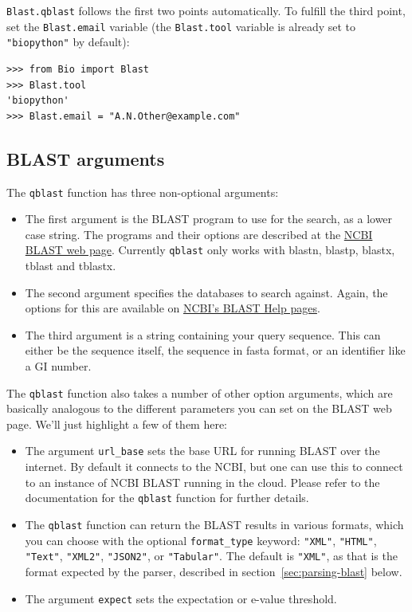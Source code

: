 \verb|Blast.qblast| follows the first two points automatically. 
To fulfill the third point, set the \verb|Blast.email| variable (the
\verb|Blast.tool| variable is already set to \verb|"biopython"| by default):
\begin{verbatim}
>>> from Bio import Blast
>>> Blast.tool
'biopython'
>>> Blast.email = "A.N.Other@example.com"
\end{verbatim}

\subsection{BLAST arguments}
\label{subsec:blast-arguments}

The \verb|qblast| function has three non-optional arguments:
\begin{itemize}
\item The first argument is the BLAST program to use for the search, as a
lower case string. The programs and their options are described at the
\href{https://blast.ncbi.nlm.nih.gov/Blast.cgi}{NCBI BLAST web page}.
Currently \verb|qblast| only works with blastn, blastp, blastx, tblast
and tblastx.
\item The second argument specifies the databases to search against. Again,
the options for this are available on \href{https://blast.ncbi.nlm.nih.gov/doc/blast-help/}{NCBI's BLAST Help pages}.
\item The third argument is a string containing your query sequence.  This
can either be the sequence itself, the sequence in fasta format,
or an identifier like a GI number.
\end{itemize}

The \verb|qblast| function also takes a number of other option arguments,
which are basically analogous to the different parameters you can set
on the BLAST web page.  We'll just highlight a few of them here:

\begin{itemize}
\item The argument \verb|url_base| sets the base URL for running BLAST over the
internet. By default it connects to the NCBI, but one can use this to connect
to an instance of NCBI BLAST running in the cloud. Please refer to the documentation
for the \verb|qblast| function for further details.
\item The \verb|qblast| function can return the BLAST results in various
formats, which you can choose with the optional \verb|format_type| keyword:
\verb|"XML"|, \verb|"HTML"|, \verb|"Text"|, \verb|"XML2"|, \verb|"JSON2"|, or
\verb|"Tabular"|.
The default is \verb|"XML"|, as that is the format expected by the parser,
described in section~\ref{sec:parsing-blast} below.
\item The argument \verb|expect| sets the expectation or e-value threshold.
\end{itemize}

